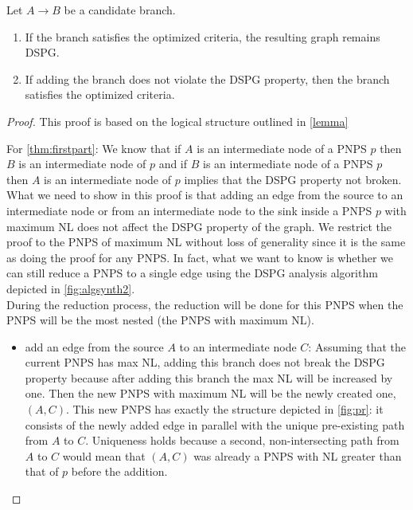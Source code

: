 \begin{theorem}
\label{thm:optimized-sound}
Let $A \rightarrow B$ be a candidate branch.

\begin{enumerate}
    \item If the branch satisfies the optimized criteria, the resulting graph remains \ac{DSPG}. \label{thm:firstpart}
    \item If adding the branch does not violate the \ac{DSPG} property, then the branch satisfies the optimized criteria. \label{thm:secondpart}
\end{enumerate}
\end{theorem}

\begin{proof}
This proof is based on the logical structure outlined in \cref{lemma}

For \ref{thm:firstpart}: We know that if $A$ is an intermediate node of a PNPS $p$ then $B$ is an intermediate node of $p$ and if $B$ is an intermediate node of a PNPS $p$ then $A$ is an intermediate node of $p$ implies that the \ac{DSPG} property not broken. What we need to show in this proof is that adding an edge from the source to an intermediate node or from an intermediate node to the sink inside a PNPS $p$ with maximum \ac{NL} does not affect the \ac{DSPG} property of the graph. We restrict the proof to the \ac{PNPS} of maximum \ac{NL} without loss of generality since it is the same as doing the proof for any \ac{PNPS}. In fact, what we want to know is whether we can still reduce a \ac{PNPS} to a single edge using the \ac{DSPG} analysis algorithm depicted in \cref{fig:algsynth2}. 
\\
During the reduction process, the reduction will be done for this \ac{PNPS} when the \ac{PNPS} will be the most nested (the PNPS with maximum \ac{NL}).
    \begin{itemize}
        \item add an edge from the source $A$ to an intermediate node $C$:
        Assuming that the current \ac{PNPS} has max \ac{NL}, adding this branch does not break the \ac{DSPG} property because after adding this branch the max \ac{NL} will be increased by one. Then the new \ac{PNPS} with maximum \ac{NL} will be the newly created one, $(A,C)$. This new \ac{PNPS} has exactly the structure depicted in \cref{fig:pr}: it consists of the newly added edge in parallel with the unique pre-existing path from $A$ to $C$. Uniqueness holds because a second, non-intersecting path from $A$ to $C$ would mean that $(A,C)$ was already a \ac{PNPS} with \ac{NL} greater than that of $p$ before the addition.
    

\end{itemize}
\end{proof}
